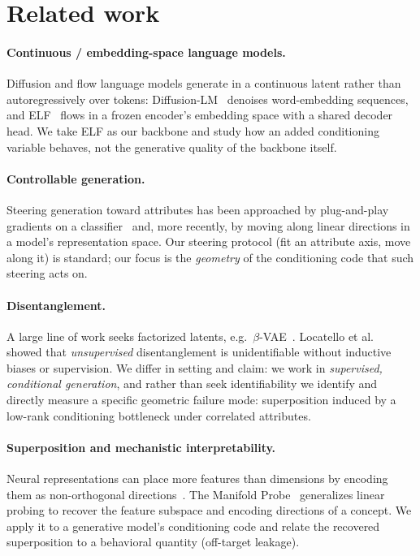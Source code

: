 \documentclass[11pt]{article}
\begin{document}
\section{Related work}

\paragraph{Continuous / embedding-space language models.} Diffusion and flow language
models generate in a continuous latent rather than autoregressively over tokens:
Diffusion-LM~\cite{diffusionlm} denoises word-embedding sequences, and
ELF~\cite{elf2026} flows in a frozen encoder's embedding space with a shared decoder
head. We take ELF as our backbone and study how an added conditioning variable
behaves, not the generative quality of the backbone itself.

\paragraph{Controllable generation.} Steering generation toward attributes has been
approached by plug-and-play gradients on a classifier~\cite{pplm} and, more recently,
by moving along linear directions in a model's representation space. Our steering
protocol (fit an attribute axis, move along it) is standard; our focus is the
\emph{geometry} of the conditioning code that such steering acts on.

\paragraph{Disentanglement.} A large line of work seeks factorized latents, e.g.\
$\beta$-VAE~\cite{betavae}. Locatello et al.~\cite{locatello} showed that
\emph{unsupervised} disentanglement is unidentifiable without inductive biases or
supervision. We differ in setting and claim: we work in \emph{supervised,
conditional generation}, and rather than seek identifiability we identify and
directly measure a specific geometric failure mode: superposition induced by a
low-rank conditioning bottleneck under correlated attributes.

\paragraph{Superposition and mechanistic interpretability.} Neural representations
can place more features than dimensions by encoding them as non-orthogonal
directions~\cite{elhage}. The Manifold Probe~\cite{manifold2026} generalizes linear
probing to recover the feature subspace and encoding directions of a concept. We
apply it to a generative model's conditioning code and relate the recovered
superposition to a behavioral quantity (off-target leakage).
\end{document}
